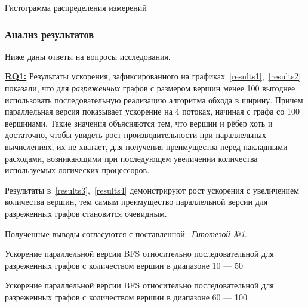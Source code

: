 \begin{table}[h]
  \centering

\caption{Гистограмма распределения измерений}
\label{histogram}
\end{table}


\subsubsection*{Анализ результатов}
Ниже даны ответы на вопросы исследования.
\newline

\hyperref[rq1]{\textbf{RQ1:}}
Результаты ускорения, зафиксированного на графиках~\ref{results1},~\ref{results2} показали, что для \emph{разреженных} графов с размером вершин менее 100 выгоднее использовать последовательную реализацию алгоритма обхода в ширину. Причем параллельная версия показывает ускорение на 4 потоках, начиная с графа со 100 вершинами. Такие значения объясняются тем, что вершин и рёбер хоть и достаточно, чтобы увидеть рост производительности при параллельных вычислениях, их не хватает, для получения преимущества перед накладными расходами, возникающими при последующем увеличении количества используемых логических процессоров. 

Результаты в~\ref{results3},~\ref{results4} демонстрируют рост ускорения с увеличением количества вершин, тем самым преимущество параллельной версии для разреженных графов становится очевидным.

Полученные выводы согласуются с поставленной ~\hyperref[t1]{\textit{Гипотезой №1}}.
\newline

\begin{table}
  \centering

\caption{Ускорение параллельной версии BFS относительно последовательной для разреженных графов с количеством вершин в диапазоне 10 --- 50}
\label{results1}
\end{table}

\begin{table}
  \centering

\caption{Ускорение параллельной версии BFS относительно последовательной для разреженных графов с количеством вершин в диапазоне 60 --- 100}
\label{results2}
\end{table}

